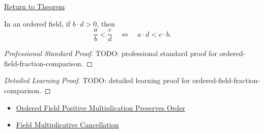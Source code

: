 \newpage
{}
\label{prf:ordered-field-fraction-comparison}

\begin{remark*}[Return]
\hyperref[thm:positive-multiplication-preserves-order-on-q]{Return to Theorem}
\end{remark*}

\begin{theorem*}
In an ordered field, if $b\cdot d>0$, then
\[
\frac{a}{b}<\frac{c}{d}
\quad\Longleftrightarrow\quad
a\cdot d<c\cdot b.
\]
\end{theorem*}

\begin{proof}[Professional Standard Proof]
\LRAProofBodyStart
TODO: professional standard proof for ordered-field-fraction-comparison.
\end{proof}

\begin{proof}[Detailed Learning Proof]
\LRAProofBodyStart
TODO: detailed learning proof for ordered-field-fraction-comparison.
\end{proof}

\begin{remark*}
\end{remark*}

\begin{dependencies}
\begin{itemize}
  \item \hyperref[thm:ordered-field-positive-multiplication-preserves-order]{Ordered Field Positive Multiplication Preserves Order}
  \item \hyperref[thm:field-multiplicative-cancellation]{Field Multiplicative Cancellation}
\end{itemize}
\end{dependencies}

\clearpage
